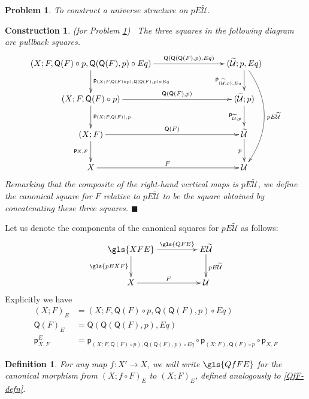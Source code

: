 \documentclass[12pt]{article}
\numberwithin{equation}{section}
\newenvironment{eq}{\begin{equation}}{\end{equation}}
\newtheorem{definition}[proposition]{Definition}
\newtheorem{problem}[proposition]{Problem}
\newtheorem{construction0}[proposition]{Construction}
\newenvironment{construction}[1]{\begin{construction0}(for Problem \ref{#1})\ }{$\blacksquare$ \end{construction0}}
\newcommand{\sr}{\rightarrow}
\newcommand{\wt}{\widetilde}
\newcommand{\p}{\mathsf{p}}
\newcommand{\U}{\mathcal{U}}
\newcommand{\Q}{\mathsf{Q}}
\begin{document}
\begin{problem}
\label{2015.05.08.prob1} To construct a universe structure on $pE\wt{\U}$.
\end{problem}
%
\begin{construction}{2015.05.08.prob1}\rm
\label{2015.05.08.constr1} The three squares in the following diagram are pullback squares.
\begin{eq}\label{pEU-diagram}
  \begin{xy}
    \xymatrix@C=7pc{
      (X;F,\Q(F)\circ p, \Q(\Q(F),p)\circ Eq)
          \ar[r]^-{\Q(\Q(\Q(F),p),Eq)}
          \ar[d]^-{\p_{(X;F,\Q(F)\circ p), \Q(\Q(F),p)\circ Eq}}                  & (\wt{\U}; p, Eq) \ar[d]_{\p_{(\wt{\U};p),Eq}} \ar@/^2pc/[ddd]^{pE\wt{\U}} \\
      (X;F,\Q(F)\circ p) 
          \ar[r]^-{\Q(\Q(F),p)} 
          \ar[d]^-{\p_{(X;F,\Q(F)), p}}                                           & (\wt{\U};p) \ar[d]_{\p_{\wt{\U},p}} \\
      (X;F) 
          \ar[r]^-{\Q(F)} 
          \ar[d]_{\p_{X,F}}                                                       & \wt{\U} \ar[d]_{p} \\
      X \ar[r]^{F}                                                                & \U
    }
  \end{xy}
\end{eq}%
Remarking that the composite of the right-hand vertical maps is $pE\wt{\U}$, we
define the canonical square for $F$ relative to $pE\wt{\U}$ to be the
square obtained by concatenating these three squares.
\end{construction}
%
Let us denote the components of the canonical squares for $pE\wt{\U}$ as
follows:
%
\begin{eq}
          \xymatrix@C=4pc{ \gls{XFE} \ar[r]^-{\gls{QFE}} \ar[d]_{\gls{pEXF}} &
            E\wt{\U} \ar[d]^{pE\wt{\U}}\\ X \ar[r]^{F} & \U }
\end{eq}
%
Explicitly we have
%
\begin{align}
  (X;F)_{E}&=(X;F,\Q(F)\circ p, \Q(\Q(F),p)\circ Eq) \\
  \Q(F)_{E}&=\Q(\Q(\Q(F),p),Eq) \label{defQFE} \\
  \p_{X,F}^E&=\p_{(X;F,\Q(F)\circ p),\Q(\Q(F),p)\circ Eq}\circ \p_{(X;F),\Q(F)\circ p}\circ \p_{X,F}
\end{align}
%
\begin{definition}
  \label{QfFE-defn}
  For any map $f:X' \sr X$, we will write $\gls{QfFE}$ for the canonical morphism from
  $(X;f\circ F)_{E}$ to $(X;F)_{E}$, defined analogously to \ref{QfF-defn}.
\end{definition}
\end{document}
